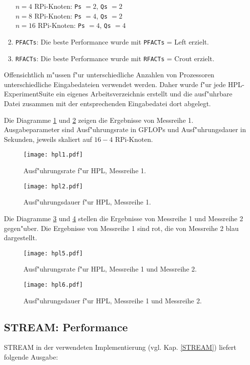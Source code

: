 \begin{enumerate}
$n=4$ RPi-Knoten: \texttt{Ps} $=2$, \texttt{Qs} $=2$\\ 
$n=8$ RPi-Knoten: \texttt{Ps} $=4$, \texttt{Qs} $=2$\\ 
$n=16$ RPi-Knoten: \texttt{Ps} $=4$, \texttt{Qs} $=4$
	\item \texttt{PFACTs}: Die beste Performance wurde mit \texttt{PFACTs} = Left erzielt. 
	\item \texttt{RFACTs}: Die beste Performance wurde mit \texttt{RFACTs} = Crout erzielt.
\end{enumerate}
Offensichtlich m"ussen f"ur unterschiedliche Anzahlen von Prozessoren unterschiedliche Eingabedateien verwendet werden. Daher wurde f"ur jede HPL-ExperimentSuite ein eigenes Arbeitsverzeichnis erstellt und die ausf"uhrbare Datei zusammen mit der entsprechenden Eingabedatei dort abgelegt. 

Die Diagramme \ref{fig:hpl1} und \ref{fig:hpl2} zeigen die Ergebnisse von Messreihe 1. Ausgabeparameter sind Ausf"uhrungsrate in GFLOPs und Ausf"uhrungsdauer in Sekunden, jeweils skaliert auf $16-4$ RPi-Knoten.
\begin{figure}[htb]
  \centering
  \texttt{[image: hpl1.pdf]}\\ 
  \caption{Ausf"uhrungsrate f"ur HPL, Messreihe 1.}
  \label{fig:hpl1}		
\end{figure}
\begin{figure}[htb]
  \centering
  \texttt{[image: hpl2.pdf]}\\ 
  \caption{Ausf"uhrungsdauer f"ur HPL, Messreihe 1.}
  \label{fig:hpl2}		
\end{figure}
\noindent
Die Diagramme \ref{fig:hpl5} und \ref{fig:hpl6} stellen die Ergebnisse von Messreihe 1 und Messreihe 2 gegen"uber. Die Ergebnisse von Messreihe 1 sind rot, die von Messreihe 2 blau dargestellt.
\begin{figure}[htb]
  \centering
  \texttt{[image: hpl5.pdf]}\\ 
  \caption{Ausf"uhrungsrate f"ur HPL, Messreihe 1 und Messreihe 2.}\label{fig:hpl5}
\end{figure}
\begin{figure}[htb]
  \centering
  \texttt{[image: hpl6.pdf]}\\ 
  \caption{Ausf"uhrungsdauer f"ur HPL, Messreihe 1 und Messreihe 2.}\label{fig:hpl6}
\end{figure}

\subsection{STREAM: Performance}\label{Ergebnisse-STREAM}
STREAM in der verwendeten Implementierung (vgl. Kap. \ref{STREAM}) liefert folgende Ausgabe:


